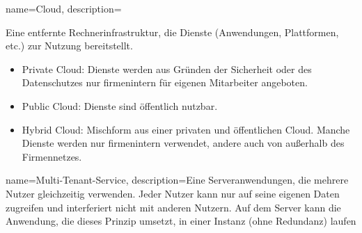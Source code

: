 %




{%
  name={Cloud},
  description={Eine entfernte Rechnerinfrastruktur, die Dienste (Anwendungen, Plattformen, etc.) zur Nutzung bereitstellt.
    \begin{itemize}
      \item Private Cloud: Dienste werden aus Gründen der Sicherheit oder des Datenschutzes nur firmenintern für eigenen Mitarbeiter angeboten.
      \item Public Cloud: Dienste sind öffentlich nutzbar.
      \item Hybrid Cloud: Mischform aus einer privaten und öffentlichen Cloud. Manche Dienste werden nur firmenintern verwendet, andere auch von außerhalb des Firmennetzes.
    \end{itemize}\cite{cloud}
  }
}

{%
  name={Multi-Tenant-Service},
  description={Eine Serveranwendungen, die mehrere Nutzer gleichzeitig verwenden. Jeder Nutzer kann nur auf seine eigenen Daten zugreifen und interferiert nicht mit anderen Nutzern. Auf dem Server kann die Anwendung, die dieses Prinzip umsetzt, in einer Instanz (ohne Redundanz) laufen \cite{multitenant}}
}




%
